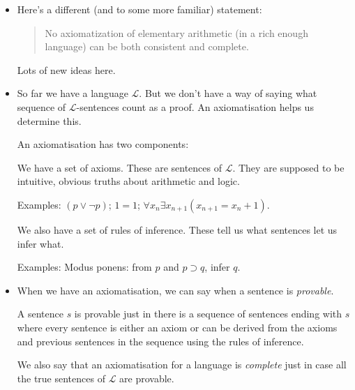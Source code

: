 \documentclass[justified]{tufte-handout}
\begin{document}
\begin{itemize}


\item Here's a different (and to some more familiar) statement: 

\begin{quote}

No axiomatization of elementary arithmetic (in a
rich enough language) can be both consistent and complete.

\end{quote}

Lots of new ideas here.

\item  So far we have a language $\mathcal{L}$. But we don't have a way of saying what sequence of $\mathcal{L}$-sentences count as a proof. An axiomatisation helps us determine this. 

\vspace{.2cm}

\noindent An axiomatisation has two components:

\vspace{.2cm}

\noindent We have a set of axioms. These are sentences of $\mathcal{L}$. They are supposed to be intuitive, obvious truths about arithmetic and logic. 

Examples: $(p\vee \neg p)$; $1=1$; $\forall x_n \exists x_{n+1} ( x_{n+1} = x_{n} +1)$.

\vspace{.3cm}

\noindent We also have a set of rules of inference. These tell us what sentences let us infer what.

Examples: Modus ponens: from $p$ and $p\supset q$, infer $q$.

\vspace{.2cm}


\item When we have an axiomatisation, we can say when a sentence is \emph{provable}.

A sentence $s$ is provable just in there is a sequence of sentences ending with $s$ where every sentence is either an axiom or can be derived from the axioms and previous sentences in the sequence using the rules of inference.

\vspace{.2cm}

 \noindent We also say that an axiomatisation for a language is \emph{complete} just in case all the true sentences of $\mathcal{L}$ are provable.


\end{itemize}
\end{document}
